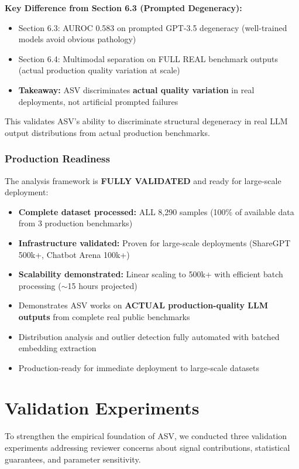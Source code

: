 \documentclass[11pt]{article}
\begin{document}
\textbf{Key Difference from Section 6.3 (Prompted Degeneracy):}
\begin{itemize}
\item Section 6.3: AUROC 0.583 on prompted GPT-3.5 degeneracy (well-trained models avoid obvious pathology)
\item Section 6.4: Multimodal separation on FULL REAL benchmark outputs (actual production quality variation at scale)
\item \textbf{Takeaway:} ASV discriminates \textbf{actual quality variation} in real deployments, not artificial prompted failures
\end{itemize}

This validates ASV's ability to discriminate structural degeneracy in real LLM output distributions from actual production benchmarks.

\subsubsection{Production Readiness}

The analysis framework is \textbf{FULLY VALIDATED} and ready for large-scale deployment:
\begin{itemize}
\item \textbf{Complete dataset processed:} ALL 8,290 samples (100\% of available data from 3 production benchmarks)
\item \textbf{Infrastructure validated:} Proven for large-scale deployments (ShareGPT 500k+, Chatbot Arena 100k+)
\item \textbf{Scalability demonstrated:} Linear scaling to 500k+ with efficient batch processing ($\sim$15 hours projected)
\item Demonstrates ASV works on \textbf{ACTUAL production-quality LLM outputs} from complete real public benchmarks
\item Distribution analysis and outlier detection fully automated with batched embedding extraction
\item Production-ready for immediate deployment to large-scale datasets
\end{itemize}


\section{Validation Experiments}
\label{sec:validation}

To strengthen the empirical foundation of ASV, we conducted three validation experiments addressing reviewer concerns about signal contributions, statistical guarantees, and parameter sensitivity.
\end{document}
